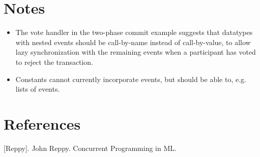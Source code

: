 \documentclass[acmsmall]{acmart}
\begin{document}
\section{Notes}

\begin{itemize}
\item The vote handler in the two-phase commit example suggests that datatypes with nested events should be call-by-name instead of call-by-value, to allow lazy synchronization with the remaining events when a participant has voted to reject the transaction.
\item Constants cannot currently incorporate events, but should be able to, e.g. lists of events.
\end{itemize}

\section{References}

[Reppy]. John Reppy. Concurrent Programming in ML.
\end{document}
